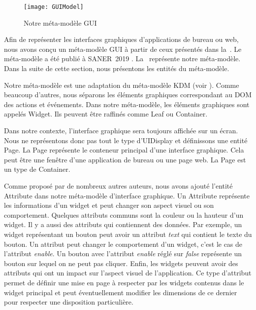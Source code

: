 \documentclass[a4paper]{article}
\begin{document}
\begin{figure}[h]
  \begin{center}
  \texttt{[image: GUIModel]}
  \caption{Notre méta-modèle GUI}
  \label{fig:guimetamodel}
  \end{center}
\end{figure}
  
Afin de représenter les interfaces graphiques d'applications de bureau ou web, 
  nous avons conçu un méta-modèle GUI à partir de ceux présentés dans la~.
Le méta-modèle a été publié à SANER~2019 \citep{Verh19a}.
La~ représente notre méta-modèle.
Dans la suite de cette section, nous présentons les entités du méta-modèle.



Notre méta-modèle est une adaptation du méta-modèle KDM (voir ).
Comme beaucoup d'autres, nous séparons les éléments graphiques correspondant au DOM des actions et événements.
Dans notre méta-modèle, les éléments graphiques sont appelés Widget. 
Ils peuvent être raffinés comme Leaf ou Container.

Dans notre contexte, l'interface graphique sera toujours affichée sur un écran.
Nous ne représentons donc pas tout le type d'UIDisplay et définissons une entité Page.
La Page représente le conteneur principal d'une interface graphique.
Cela peut être une fenêtre d'une application de bureau ou une page web.
La Page est un type de Container.

Comme proposé par de nombreux autres auteurs, nous avons ajouté l'entité Attribute dans notre méta-modèle d'interface graphique.
Un Attribute représente les informations d'un widget
  et peut changer son aspect visuel ou son comportement.
Quelques attributs communs sont la couleur ou la hauteur d'un widget. 
Il y a aussi des attributs qui contiennent des données.
Par exemple, un widget représentant un bouton peut avoir un attribut \emph{text} qui contient le texte du bouton.
Un attribut peut changer le comportement d'un widget, c'est le cas de l'attribut \textit{enable}.
Un bouton avec l'attribut \textit{enable} réglé sur \textit{false} représente un bouton sur lequel on ne peut pas cliquer.
Enfin, les widgets peuvent avoir des attributs qui ont un impact sur l'aspect visuel de l'application.
Ce type d'attribut permet de définir une mise en page à respecter par les widgets contenus dans le widget principal et peut
  éventuellement modifier les dimensions de ce dernier pour respecter une disposition particulière.
\end{document}
